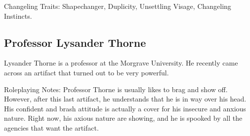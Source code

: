 \documentclass[twocolumn]{dndbook}
\begin{document}







Changeling Traits: Shapechanger, Duplicity, Unsettling Visage, Changeling Instincts.

\subsection{Professor Lysander Thorne}
\label{subsec:professor_lysander_thorne}

Lysander Thorne is a professor at the Morgrave University.
He recently came across an artifact that turned out to be very powerful.

Roleplaying Notes: Professor Thorne is usually likes to brag and show off.
However, after this last artifact, he understands that he is in way over his head.
His confident and brash attitude is actually a cover for his insecure and anxious nature.
Right now, his axious nature are showing, and he is spooked by all the agencies that want the artifact.
\end{document}
